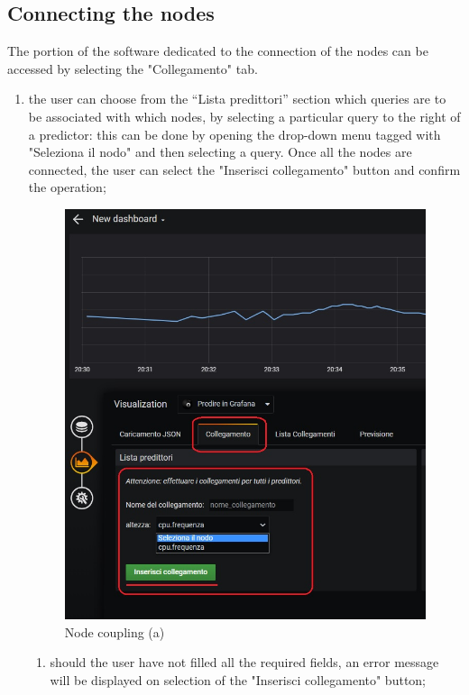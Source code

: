 \subsection{Connecting the nodes}
The portion of the software dedicated to the connection of the nodes can be accessed by selecting the "Collegamento" tab.
\begin{enumerate}
	\item the user can choose from the “Lista predittori” section which queries are to be associated with which nodes, by selecting a particular query to the right of a predictor: this can be done by opening the drop-down menu tagged with "Seleziona il nodo" and then selecting a query.
	Once all the nodes are connected, the user can select the "Inserisci collegamento" button and confirm the operation;
	
\begin{figure}[H]
\centering
\includegraphics[scale=0.75]{img/plug-in/insert_node.png}
\caption{Node coupling (a)}
\end{figure}



\begin{enumerate}
\item should the user have not filled all the required fields, an error message will be displayed on selection of the "Inserisci collegamento" button;


\end{enumerate}
\end{enumerate}
